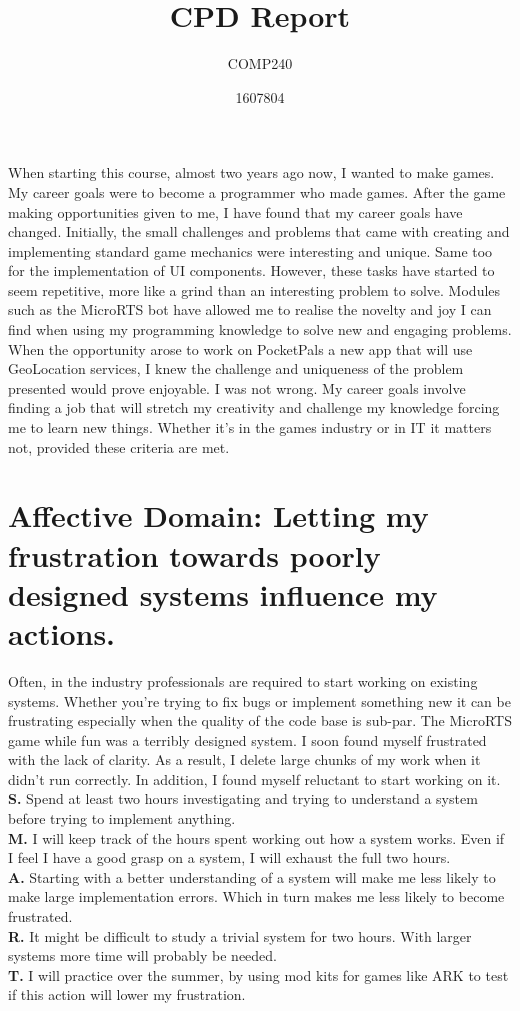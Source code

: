 \documentclass{scrartcl}
\title{CPD Report}
\subtitle{COMP240}
\author{1607804}
\begin{document}
\maketitle

\abstract{}
When starting this course, almost two years ago now, I wanted to make games. My career goals were to become a programmer who made games. After the game making opportunities given to me, I have found that my career goals have changed. Initially, the small challenges and problems that came with creating and implementing standard game mechanics were interesting and unique. Same too for the implementation of UI components. However, these tasks have started to seem repetitive, more like a grind than an interesting problem to solve. Modules such as the MicroRTS bot have allowed me to realise the novelty and joy I can find when using my programming knowledge to solve new and engaging problems. When the opportunity arose to work on PocketPals a new app that will use GeoLocation services, I knew the challenge and uniqueness of the problem presented would prove enjoyable. I was not wrong. My career goals involve finding a job that will stretch my creativity and challenge my knowledge forcing me to learn new things. Whether it's in the games industry or in IT it matters not, provided these criteria are met.

\section{Affective Domain: Letting my frustration towards poorly designed systems influence my actions.}
Often, in the industry professionals are required to start working on existing systems. Whether you're trying to fix bugs or implement something new it can be frustrating
especially when the quality of the code base is sub-par. The MicroRTS game while fun was a terribly designed system. I soon found myself frustrated with the lack of clarity.
As a result, I delete large chunks of my work when it didn't run correctly. In addition, I found myself reluctant to start working on it.\\
\textbf{S.}    Spend at least two hours investigating and trying to understand a system before trying to implement anything.\\
\textbf{M.}   I will keep track of the hours spent working out how a system works. Even if I feel I have a good grasp on a system, I will exhaust the full two hours.\\
\textbf{A.}   Starting with a better understanding of a system will make me less likely to make large implementation errors. Which in turn makes me less likely to become frustrated.\\
\textbf{R.}   It might be difficult to study a trivial system for two hours. With larger systems more time will probably be needed.\\
\textbf{T.}   I will practice over the summer, by using mod kits for games like ARK to test if this action will lower my frustration.\\
\end{document}
